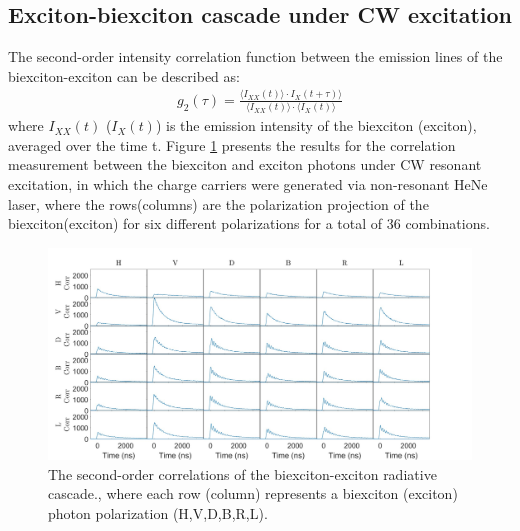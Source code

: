 \subsection{Exciton-biexciton cascade under CW excitation}
The second-order intensity correlation function between the emission lines of the biexciton-exciton can be described as:
\begin{equation} \label{second_order_correlations}
\begin{aligned} 
        g_2(\tau) = \frac{\langle I_{XX}(t) \rangle\cdot  I_{X}(t+\tau) \rangle}{\langle I_{XX}(t)\rangle \cdot\langle I_{X}(t)\rangle}
\end{aligned}
\end{equation}
where $I_{XX}(t)$ ($I_X(t)$) is the emission intensity of the biexciton (exciton), averaged over the time t.
Figure \ref{fig:XX_X_Correlations} presents the results for the correlation measurement between the biexciton and exciton photons under CW resonant excitation, in which the charge carriers were generated via non-resonant HeNe laser, where the rows(columns) are the polarization projection of the biexciton(exciton) for six different polarizations for a total of 36 combinations.
\begin{figure}[H]
	\centering
	\includegraphics[scale=0.24]{figures/XX_X_Correlations.jpg}
	\caption{ The second-order correlations of the biexciton-exciton radiative cascade., where each row (column) represents a biexciton (exciton) photon polarization (H,V,D,B,R,L).}
	\label{fig:XX_X_Correlations}
\end{figure}
